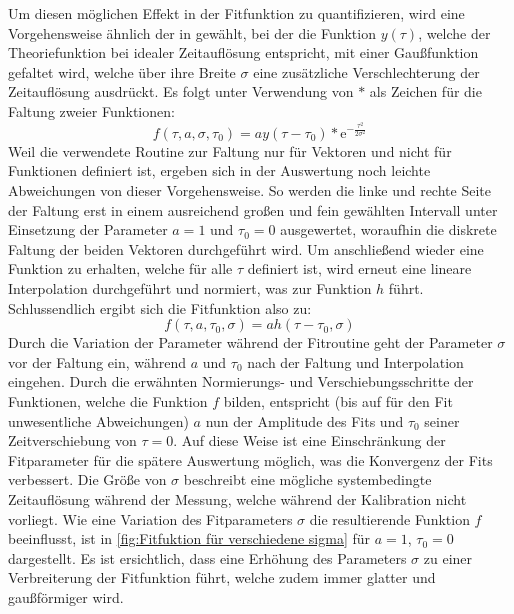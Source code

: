 Um diesen möglichen Effekt in der Fitfunktion zu quantifizieren, wird eine Vorgehensweise ähnlich der in \cite{lasseguesFieldIntensityCorrelations2022} gewählt, bei der die Funktion $y(\tau)$, welche der Theoriefunktion bei idealer Zeitauflösung entspricht, mit einer Gaußfunktion gefaltet wird, welche über ihre Breite $\sigma$ eine zusätzliche Verschlechterung der Zeitauflösung ausdrückt. 
Es folgt unter Verwendung von $*$ als Zeichen für die Faltung zweier Funktionen:
\begin{equation}
    f(\tau, a, \sigma, \tau_0) = ay(\tau - \tau_0) * \mathrm{e}^{-\frac{\tau^2}{2\sigma^2}}
\end{equation}
Weil die verwendete Routine zur Faltung nur für Vektoren und nicht für Funktionen definiert ist, ergeben sich in der Auswertung noch leichte Abweichungen von dieser Vorgehensweise. 
So werden die linke und rechte Seite der Faltung erst in einem ausreichend großen und fein gewählten Intervall unter Einsetzung der Parameter $a=1$ und $\tau_0 = 0$ ausgewertet, woraufhin die diskrete Faltung der beiden Vektoren durchgeführt wird. 
Um anschließend wieder eine Funktion zu erhalten, welche für alle $\tau$ definiert ist, wird erneut eine lineare Interpolation durchgeführt und normiert, was zur Funktion $h$ führt. 
Schlussendlich ergibt sich die Fitfunktion also zu:
\begin{equation}
    f(\tau, a, \tau_0, \sigma) = ah(\tau- \tau_0, \sigma)
    \label{eq:fit funktion final}
\end{equation} 
Durch die Variation der Parameter während der Fitroutine geht der Parameter $\sigma$ vor der Faltung ein, während $a$ und $\tau_0$ nach der Faltung und Interpolation eingehen. 
Durch die erwähnten Normierungs- und Verschiebungsschritte der Funktionen, welche die Funktion $f$ bilden, entspricht (bis auf für den Fit unwesentliche Abweichungen) $a$ nun der Amplitude des Fits und $\tau_0$ seiner Zeitverschiebung von $\tau=0$. 
Auf diese Weise ist eine Einschränkung der Fitparameter für die spätere Auswertung möglich, was die Konvergenz der Fits verbessert. 
Die Größe von $\sigma$ beschreibt eine mögliche systembedingte Zeitauflösung während der Messung, welche während der Kalibration nicht vorliegt. 
Wie eine Variation des Fitparameters $\sigma$ die resultierende Funktion $f$ beeinflusst, ist in \autoref{fig:Fitfuktion für verschiedene sigma} für $a=1$, $\tau_0=0$ dargestellt. 
Es ist ersichtlich, dass eine Erhöhung des Parameters $\sigma$ zu einer Verbreiterung der Fitfunktion führt, welche zudem immer glatter und gaußförmiger wird. 

